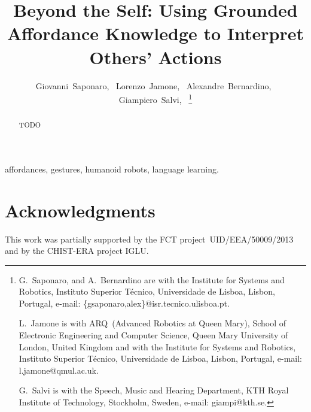 \documentclass[journal]{IEEEtran}
\begin{document}
\title{Beyond the Self: Using Grounded Affordance Knowledge to Interpret Others' Actions}

\author{Giovanni~Saponaro,~
        Lorenzo~Jamone,~
        Alexandre~Bernardino,~
        Giampiero~Salvi,~
\thanks{G.~Saponaro, and A.~Bernardino are with the
Institute for Systems and Robotics, Instituto Superior Técnico,
Universidade de Lisboa, Lisbon, Portugal, e-mail: \{gsaponaro,alex\}@isr.tecnico.ulisboa.pt.

L.~Jamone is with ARQ~(Advanced Robotics at Queen Mary), School of Electronic Engineering and Computer Science, Queen Mary University of London, United Kingdom
and with the
Institute for Systems and Robotics, Instituto Superior Técnico, Universidade de Lisboa, Lisbon, Portugal,
e-mail: l.jamone@qmul.ac.uk.

G.~Salvi is with the Speech, Music and Hearing Department,
KTH Royal Institute of Technology, Stockholm, Sweden,
e-mail: giampi@kth.se.
}}

\maketitle

\begin{abstract}
TODO
\end{abstract}

\begin{IEEEkeywords}
affordances, gestures, humanoid robots, language learning.
\end{IEEEkeywords}











\section*{Acknowledgments}

This work was partially supported by the FCT project~UID/EEA/50009/2013 and by the CHIST-ERA project IGLU.

\printbibliography
\end{document}
